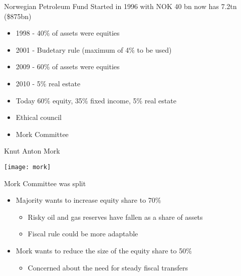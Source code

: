 \documentclass[14pt,xcolor=pdftex,dvipsnames,table]{beamer}\usepackage[]{graphicx}\usepackage[]{color}
\begin{document}
\begin{frame}{Norwegian Petroleum Fund}
Started in 1996 with NOK 40 bn now has 7.2tn (\$875bn) 
\begin{itemize}[<+-| alert@+>]
\pause
\item 1998 - 40\% of assets were equities
\item 2001 - Budetary rule (maximum of 4\% to be used)
\item 2009 - 60\% of assets were equities
\item 2010 - 5\% real estate
\item Today 60\% equity, 35\% fixed income, 5\% real estate
\item Ethical council 
\item Mork Committee
\end{itemize}
\end{frame}

\begin{frame}{Knut Anton Mork}
\begin{center}
\texttt{[image: mork]}
\end{center}
\end{frame}

\begin{frame}{Mork}
Committee was split
\begin{itemize}[<+-| alert@+>]
\pause
\item Majority wants to increase equity share to 70\%
\begin{itemize}
\item Risky oil and gas reserves have fallen as a share of assets
\item Fiscal rule could be more adaptable
\end{itemize}
\item Mork wants to reduce the size of the equity share to 50\%
\begin{itemize}
\item Concerned about the need for steady fiscal transfers
\end{itemize}
\end{itemize}
\end{frame}
\end{document}
